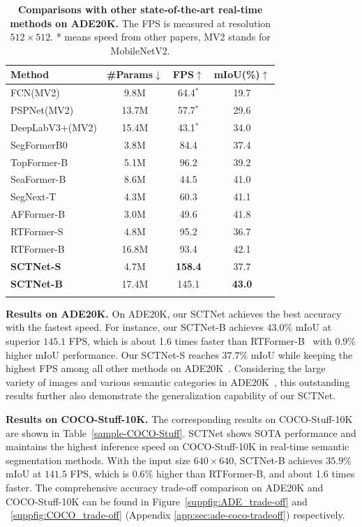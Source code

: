 \documentclass[letterpaper]{article} %
\begin{document}
\begin{table}[t]
  \centering
  \begin{tabular}{l|c|c|c}
    \Xhline{1pt}
    Method & \#Params$\downarrow$ &FPS$\uparrow$ &mIoU(\%)$\uparrow$\\
    \hline
    FCN(MV2)     &9.8M &64.4$^*$   &19.7\\
    PSPNet(MV2) &13.7M &57.7$^*$ &29.6 \\
    DeepLabV3+(MV2)  &15.4M &43.1$^*$  &34.0 \\
    SegFormerB0  &3.8M    &84.4  &37.4 \\
    TopFormer-B &5.1M &96.2    &39.2\\
    SeaFormer-B &8.6M &44.5   &41.0 \\
    SegNext-T &4.3M  &60.3   &41.1 \\
    AFFormer-B &3.0M  &49.6   &41.8 \\
    RTFormer-S  &4.8M &95.2  &36.7\\
    RTFormer-B &16.8M &93.4 &42.1 \\
    \hline
    \textbf{SCTNet-S} &4.7M &\textbf{158.4}  &37.7 \\
    \textbf{SCTNet-B} &17.4M &145.1  &\textbf{43.0}  \\
    \Xhline{1pt}
  \end{tabular}
  \caption{\textbf{Comparisons with other state-of-the-art real-time methods on ADE20K.} The FPS is measured at resolution $512\times512$. * means speed from other papers, MV2 stands for MobileNetV2.}
  \label{sample-tableADE20K}
\end{table}

\noindent
{\bf Results on ADE20K.} On ADE20K\cite{zhou2017scene}, our SCTNet achieves the best accuracy with the fastest speed. For instance, our SCTNet-B achieves $43.0\%$ mIoU at superior $145.1$ FPS, which is about 1.6 times faster than RTFormer-B~\cite{wang2022rtformer} with 0.9\% higher mIoU performance. Our SCTNet-S reaches $37.7\%$ mIoU while keeping the highest FPS among all other methods on ADE20K~\cite{zhou2017scene}. Considering the large variety of images and various semantic categories in ADE20K~\cite{zhou2017scene}, this outstanding results further also demonstrate the generalization capability of our SCTNet.

\noindent
{\bf Results on COCO-Stuff-10K.} The corresponding results on COCO-Stuff-10K are shown in Table~\ref{sample-COCO-Stuff}. SCTNet shows SOTA performance and maintains the highest inference speed on COCO-Stuff-10K in real-time semantic segmentation methods. With the input size $640 \times 640$, SCTNet-B achieves  $35.9\%$ mIoU at $141.5$ FPS, which is $0.6\%$ higher than RTFormer-B, and about 1.6 times faster. The comprehensive accuracy trade-off comparison on ADE20K and COCO-Stuff-10K can be found in Figure~\ref{suppfig:ADE_trade-off} and ~\ref{suppfig:COCO_trade-off} (Appendix \ref{app:sec:ade-coco-tradeoff}) respectively.
\end{document}
